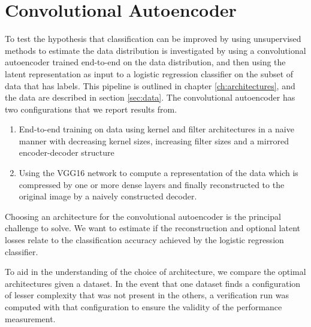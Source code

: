 \section{Convolutional Autoencoder}

To test the hypothesis that classification can be improved by using unsupervised methods to estimate the data distribution is investigated by using a convolutional autoencoder trained end-to-end on the data distribution, and then using the latent representation as input to a logistic regression classifier on the subset of data that has labels. This pipeline is outlined in chapter \ref{ch:architectures}, and the data are described in section \ref{sec:data}. The convolutional autoencoder has two configurations that we report results from. 
\begin{enumerate}[start=0, label={(\bfseries Ar\arabic*):}, ref={(Ar\arabic*)}]
	\item \label{item:clf_no_vgg} End-to-end training on data using kernel and filter architectures in a naive manner with decreasing kernel sizes, increasing filter sizes and a mirrored encoder-decoder structure
	\item \label{item:clf_freeze_vgg} Using the VGG16 network to compute a representation of the data which is compressed by one or more dense layers and finally reconstructed to the original image by a naively constructed decoder. 
\end{enumerate}

\noindent Choosing an architecture for the convolutional autoencoder is the principal challenge to solve. We want to estimate if the reconstruction and optional latent losses relate to the classification accuracy achieved by the logistic regression classifier.

To aid in the understanding of the choice of architecture, we compare the optimal architectures given a dataset. In the event that one dataset finds a configuration of lesser complexity that was not present in the others, a verification run was computed with that configuration to ensure the validity of the performance measurement.


